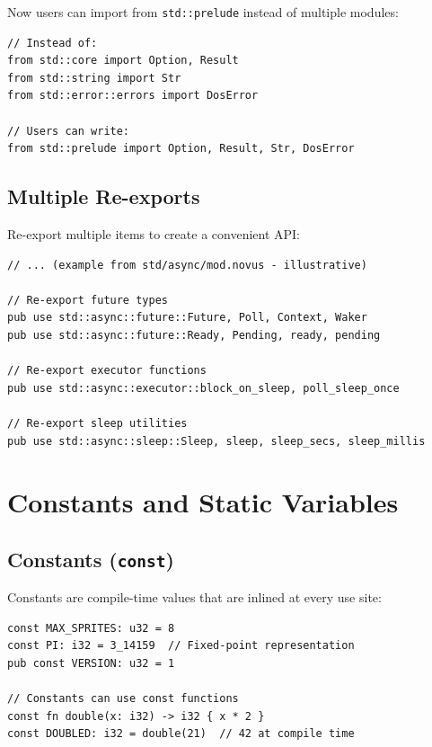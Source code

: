 Now users can import from \texttt{std::prelude} instead of multiple modules:

\begin{lstlisting}
// Instead of:
from std::core import Option, Result
from std::string import Str
from std::error::errors import DosError

// Users can write:
from std::prelude import Option, Result, Str, DosError
\end{lstlisting}

\subsection{Multiple Re-exports}
\label{subsec:multiple-reexports}

Re-export multiple items to create a convenient API:

\begin{lstlisting}
// ... (example from std/async/mod.novus - illustrative)

// Re-export future types
pub use std::async::future::Future, Poll, Context, Waker
pub use std::async::future::Ready, Pending, ready, pending

// Re-export executor functions
pub use std::async::executor::block_on_sleep, poll_sleep_once

// Re-export sleep utilities
pub use std::async::sleep::Sleep, sleep, sleep_secs, sleep_millis
\end{lstlisting}

\section{Constants and Static Variables}
\label{sec:constants-statics}

\subsection{Constants (\texttt{const})}
\label{subsec:constants}

Constants are compile-time values that are inlined at every use site:

\begin{lstlisting}
const MAX_SPRITES: u32 = 8
const PI: i32 = 3_14159  // Fixed-point representation
pub const VERSION: u32 = 1

// Constants can use const functions
const fn double(x: i32) -> i32 { x * 2 }
const DOUBLED: i32 = double(21)  // 42 at compile time
\end{lstlisting}

